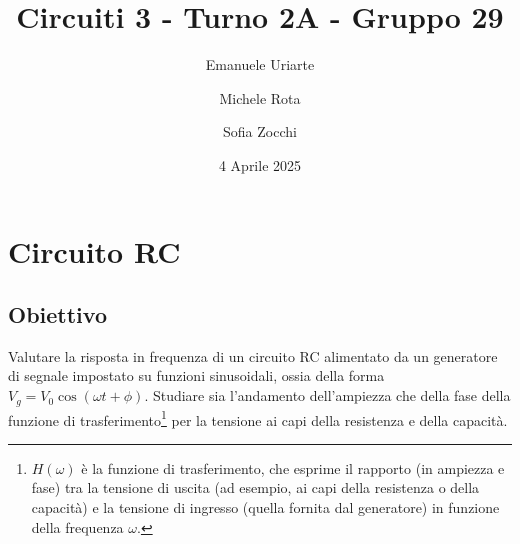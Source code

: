 \documentclass[a4paper]{article}
\title{Circuiti 3 - Turno 2A - Gruppo 29}
\author{Emanuele Uriarte \and Michele Rota \and Sofia Zocchi}
\date{4 Aprile 2025}
\begin{document}
\maketitle
\tableofcontents
\newpage

\section{Circuito RC}
\subsection{Obiettivo}
Valutare la risposta in frequenza di un circuito RC alimentato da un generatore di segnale impostato su funzioni sinusoidali, ossia della forma
$V_g = V_{0} \cos(\omega t + \phi)$. Studiare sia l'andamento dell'ampiezza che della fase della funzione di trasferimento\footnote{$H(\omega)$ è la funzione di trasferimento, che esprime il rapporto (in ampiezza e fase) tra la tensione di uscita (ad esempio, ai capi della resistenza o della capacità) e la tensione di ingresso (quella fornita dal generatore) in funzione della frequenza $\omega$.} per la tensione ai capi della resistenza e della capacità.
\end{document}
